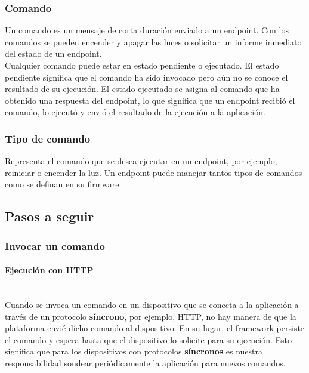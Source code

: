 \subsubsection{Comando}

Un comando es un mensaje de corta duración enviado a un endpoint. Con los comandos se pueden encender y apagar las luces o solicitar un informe inmediato del estado de un endpoint.\\

Cualquier comando puede estar en estado pendiente o ejecutado. El estado pendiente significa que el comando ha sido invocado pero aún no se conoce el resultado de su ejecución. El estado ejecutado se asigna al comando que ha obtenido una respuesta del endpoint, lo que significa que un endpoint recibió el comando, lo ejecutó y envió el resultado de la ejecución a la aplicación.\\

\subsubsection{Tipo de comando}

Representa el comando que se desea ejecutar en un endpoint, por ejemplo, reiniciar o encender la luz. Un endpoint puede manejar tantos tipos de comandos como se definan en su firmware.

\subsection{Pasos a seguir}

\subsubsection{Invocar un comando}

\paragraph{Ejecución con HTTP}  \hspace{0pt} \\

Cuando se invoca un comando en un dispositivo que se conecta a la aplicación a través de un protocolo \textbf{síncrono}, por ejemplo, HTTP, no hay manera de que la plataforma envié dicho comando al dispositivo. En su lugar, el framework persiste el comando y espera hasta que el dispositivo lo solicite para su ejecución. Esto significa que para los dispositivos con protocolos \textbf{síncronos} es nuestra responsabilidad sondear periódicamente la aplicación para nuevos comandos. \\

